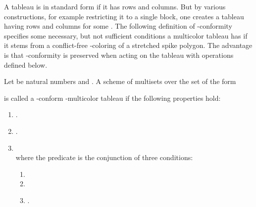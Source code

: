 \documentclass[a4paper,USenglish,numberwithinsect]{lipics}
\theoremstyle{plain}
\begin{document}
A  tableau  is in 
standard form if it has   rows and 
columns. But by various constructions, for example restricting it to a single block, one creates  
a tableau having  rows and  columns for some .
The following definition of -conformity specifies some necessary, but not sufficient conditions a multicolor tableau has if it stems 
from a conflict-free -coloring  of a stretched spike polygon. The advantage is that -conformity is preserved when acting on the tableau with 
operations defined below.

\noindent
\begin{definition}
\label{t-admis}
Let   be natural numbers and .
A scheme of  multisets over the set  of the form

is called a  
-conform -multicolor tableau
if the following properties hold:
\begin{enumerate}
\item .
\item .
\item  \\
where the predicate   is the conjunction of 
three conditions:
\begin{enumerate}
\item 
\item    
\item .
\end{enumerate}
\end{enumerate}
\end{definition}
\end{document}
